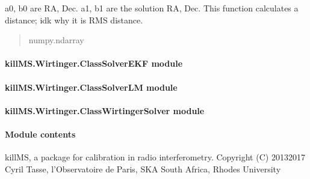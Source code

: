 \documentclass[letterpaper,10pt,english]{sphinxmanual}
\begin{document}
\begin{fulllineitems}
\label{\detokenize{api/killMS.Wirtinger:killMS.Wirtinger.ClassSolPredictMachine.D}}
\pysigstartsignatures
{}
\pysigstopsignatures
\sphinxAtStartPar
a0, b0 are RA, Dec. a1, b1 are the solution RA, Dec.
This function calculates a distance; idk why it is RMS distance.
\begin{quote}\begin{description}
\sphinxAtStartPar
numpy.ndarray

\end{description}\end{quote}

\end{fulllineitems}



\paragraph{killMS.Wirtinger.ClassSolverEKF module}
\label{\detokenize{api/killMS.Wirtinger:killms-wirtinger-classsolverekf-module}}

\paragraph{killMS.Wirtinger.ClassSolverLM module}
\label{\detokenize{api/killMS.Wirtinger:killms-wirtinger-classsolverlm-module}}

\paragraph{killMS.Wirtinger.ClassWirtingerSolver module}
\label{\detokenize{api/killMS.Wirtinger:killms-wirtinger-classwirtingersolver-module}}

\paragraph{Module contents}
\label{\detokenize{api/killMS.Wirtinger:module-killMS.Wirtinger}}\label{\detokenize{api/killMS.Wirtinger:module-contents}}
\sphinxAtStartPar
killMS, a package for calibration in radio interferometry.
Copyright (C) 2013\sphinxhyphen{}2017  Cyril Tasse, l’Observatoire de Paris,
SKA South Africa, Rhodes University
\end{document}
